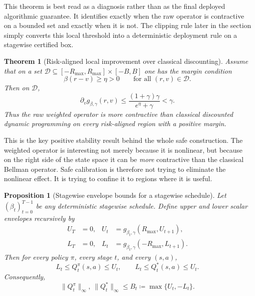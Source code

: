 \documentclass{article}
\newtheorem{theorem}{Theorem}[section]
\newtheorem{proposition}[proposition]{Proposition}
\theoremstyle{remark}
\newcommand{\defeq}{\coloneqq}
\newcommand{\gbg}{g_{\beta,\gamma}}
\begin{document}
This theorem is best read as a diagnosis rather than as the final deployed algorithmic guarantee.
It identifies exactly when the raw operator is contractive on a bounded set and exactly when it is not.
The clipping rule later in the section simply converts this local threshold into a deterministic deployment rule on a stagewise certified box.


\begin{theorem}[Risk-aligned local improvement over classical discounting]
\label{thm:aligned-contraction}
Assume that on a set $\mathcal D\subseteq[-R_{\max},R_{\max}]\times[-B,B]$ one has the margin condition
\[
\beta(r-v)\ge \eta>0
\qquad\text{for all }(r,v)\in\mathcal D.
\]
Then on $\mathcal D$,
\begin{equation}
\partial_v\gbg(r,v)
\le
\frac{(1+\gamma)\gamma}{e^{\eta}+\gamma}
<\gamma.
\label{eq:improved-local-modulus}
\end{equation}
Thus the raw weighted operator is more contractive than classical discounted dynamic programming on every risk-aligned region with a positive margin.
\end{theorem}

This is the key positive stability result behind the whole safe construction.
The weighted operator is interesting not merely because it is nonlinear, but because on the right side of the state space it can be \emph{more} contractive than the classical Bellman operator.
Safe calibration is therefore not trying to eliminate the nonlinear effect.
It is trying to confine it to regions where it is useful.


\begin{proposition}[Stagewise envelope bounds for a stagewise schedule]
\label{prop:stagewise-envelope}
Let $(\beta_t)_{t=0}^{T-1}$ be any deterministic stagewise schedule.
Define upper and lower scalar envelopes recursively by
\begin{align}
U_T &= 0,
&
U_t &= g_{\beta_t,\gamma}(R_{\max},U_{t+1}),
\label{eq:upper-envelope}\\
L_T &= 0,
&
L_t &= g_{\beta_t,\gamma}(-R_{\max},L_{t+1}).
\label{eq:lower-envelope}
\end{align}
Then for every policy $\pi$, every stage $t$, and every $(s,a)$,
\begin{equation}
L_t \le Q_t^\pi(s,a) \le U_t,
\qquad
L_t \le Q_t^*(s,a) \le U_t.
\label{eq:raw-envelope-bound}
\end{equation}
Consequently,
\begin{equation}
\|Q_t^\pi\|_\infty,\ \|Q_t^*\|_\infty \le B_t \defeq \max\{U_t,-L_t\}.
\label{eq:fp-bound}
\end{equation}
\end{proposition}
\end{document}

